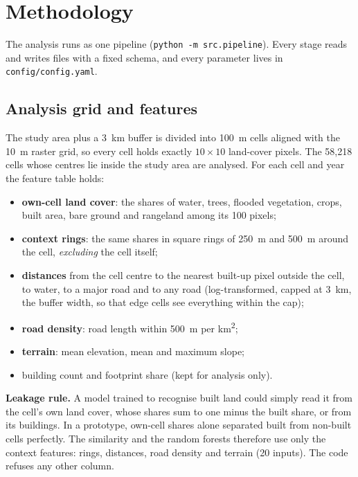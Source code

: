 \section{Methodology}\label{sec:methodology}

The analysis runs as one pipeline (\texttt{python -m src.pipeline}). Every stage reads and
writes files with a fixed schema, and every parameter lives in \texttt{config/config.yaml}.

\subsection{Analysis grid and features}

The study area plus a \SI{3}{\km} buffer is divided into \SI{100}{\m} cells aligned with the
\SI{10}{\m} raster grid, so every cell holds exactly $10\times10$ land-cover pixels. The
58{,}218 cells whose centres lie inside the study area are analysed. For each cell and year
the feature table holds:
\begin{itemize}
  \item \textbf{own-cell land cover}: the shares of water, trees, flooded vegetation, crops,
        built area, bare ground and rangeland among its 100 pixels;
  \item \textbf{context rings}: the same shares in square rings of \SI{250}{\m} and
        \SI{500}{\m} around the cell, \emph{excluding} the cell itself;
  \item \textbf{distances} from the cell centre to the nearest built-up pixel outside the cell,
        to water, to a major road and to any road (log-transformed, capped at \SI{3}{\km}, the
        buffer width, so that edge cells see everything within the cap);
  \item \textbf{road density}: road length within \SI{500}{\m} per km\textsuperscript{2};
  \item \textbf{terrain}: mean elevation, mean and maximum slope;
  \item building count and footprint share (kept for analysis only).
\end{itemize}

\textbf{Leakage rule.} A model trained to recognise built land could simply read it from the
cell's own land cover, whose shares sum to one minus the built share, or from its buildings.
In a prototype, own-cell shares alone separated built from non-built cells perfectly. The
similarity and the random forests therefore use only the context features: rings, distances,
road density and terrain (20 inputs). The code refuses any other column.

